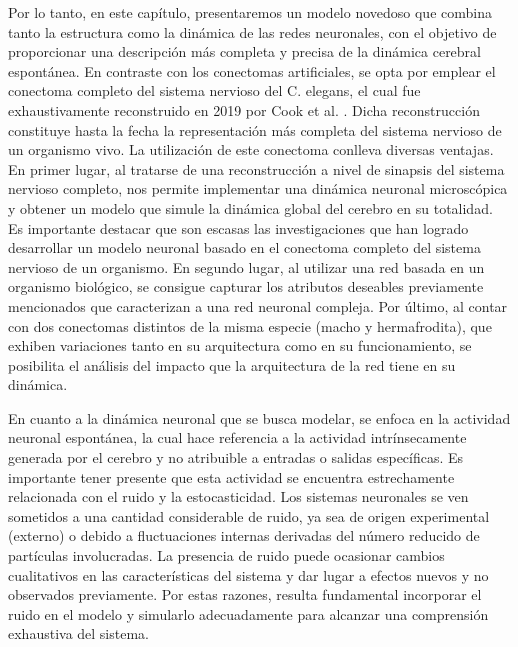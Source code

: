 Por lo tanto, en este capítulo, presentaremos un modelo novedoso que combina tanto la estructura como la dinámica de las redes neuronales, con el objetivo de proporcionar una descripción más completa y precisa de la dinámica cerebral espontánea. En contraste con los conectomas artificiales, se opta por emplear el conectoma completo del sistema nervioso del C. elegans, el cual fue exhaustivamente reconstruido en 2019 por Cook et al. \cite{cook_whole-animal_2019}. Dicha reconstrucción constituye hasta la fecha la representación más completa del sistema nervioso de un organismo vivo. La utilización de este conectoma conlleva diversas ventajas. En primer lugar, al tratarse de una reconstrucción a nivel de sinapsis del sistema nervioso completo, nos permite implementar una dinámica neuronal microscópica y obtener un modelo que simule la dinámica global del cerebro en su totalidad. Es importante destacar que son escasas las investigaciones que han logrado desarrollar un modelo neuronal basado en el conectoma completo del sistema nervioso de un organismo. En segundo lugar, al utilizar una red basada en un organismo biológico, se consigue capturar los atributos deseables previamente mencionados que caracterizan a una red neuronal compleja. Por último, al contar con dos conectomas distintos de la misma especie (macho y hermafrodita), que exhiben variaciones tanto en su arquitectura como en su funcionamiento, se posibilita el análisis del impacto que la arquitectura de la red tiene en su dinámica.

En cuanto a la dinámica neuronal que se busca modelar, se enfoca en la actividad neuronal espontánea, la cual hace referencia a la actividad intrínsecamente generada por el cerebro y no atribuible a entradas o salidas específicas. Es importante tener presente que esta actividad se encuentra estrechamente relacionada con el ruido y la estocasticidad. Los sistemas neuronales se ven sometidos a una cantidad considerable de ruido, ya sea de origen experimental (externo) o debido a fluctuaciones internas derivadas del  número reducido de partículas involucradas.  La presencia de ruido puede ocasionar cambios cualitativos en las características del sistema y dar lugar a efectos nuevos y no observados previamente. Por estas razones, resulta fundamental incorporar el ruido en el modelo y simularlo adecuadamente para alcanzar una comprensión exhaustiva del sistema.

